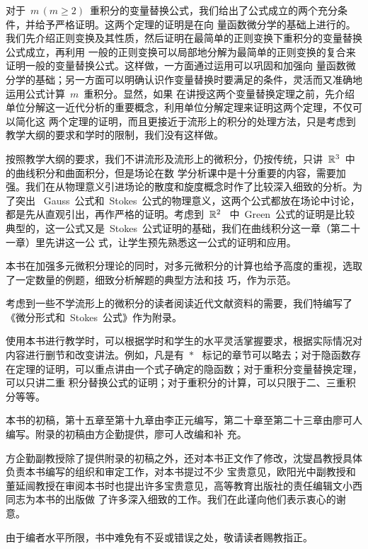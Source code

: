\begin{preface}
对于~$m\,(m\geq 2)$~重积分的变量替换公式，我们给出了公式成立的两个充分条件，并给予严格证明。这两个定理的证明是在向
量函数微分学的基础上进行的。我们先介绍正则变换及其性质，然后证明在最简单的正则变换下重积分的变量替换公式成立，再利用
一般的正则变换可以局部地分解为最简单的正则变换的复合来证明一般的变量替换公式。这样做，一方面通过运用可以巩固和加强向
量函数微分学的基础；另一方面可以明确认识作变量替换时要满足的条件，灵活而又准确地运用公式计算~$m$~重积分。显然，如果
在讲授这两个变量替换定理之前，先介绍单位分解这一近代分析的重要概念，利用单位分解定理来证明这两个定理，不仅可以简化这
两个定理的证明，而且更接近于流形上的积分的处理方法，只是考虑到教学大纲的要求和学时的限制，我们没有这样做。

按照教学大纲的要求，我们不讲流形及流形上的微积分，仍按传统，只讲~$\mathbb{R}^3$~中的曲线积分和曲面积分，但是场论在数
学分析课中是十分重要的内容，需要加强。我们在从物理意义引进场论的散度和旋度概念时作了比较深入细致的分析。为了突出
~Gauss~公式和~Stokes~公式的物理意义，这两个公式都放在场论中讨论，都是先从直观引出，再作严格的证明。考虑到~$\mathbb{R}^2$~
中~Green~公式的证明是比较典型的，这一公式又是~Stokes~公式证明的基础，我们在曲线积分这一章（第二十一章）里先讲这一公
式，让学生预先熟悉这一公式的证明和应用。

本书在加强多元微积分理论的同时，对多元微积分的计算也给予高度的重视，选取了一定数量的例题，细致分析解题的典型方法和技
巧，作为示范。

考虑到一些不学流形上的微积分的读者阅读近代文献资料的需要，我们特编写了《微分形式和~Stokes~公式》作为附录。

使用本书进行教学时，可以根据学时和学生的水平灵活掌握要求，根据实际情况对内容进行删节和改变讲法。例如，凡是有~$\ast$~
标记的章节可以略去；对于隐函数存在定理的证明，可以重点讲由一个式子确定的隐函数；对于重积分变量替换定理，可以只讲二重
积分替换公式的证明；对于重积分的计算，可以只限于二、三重积分等等。

本书的初稿，第十五章至第十九章由李正元编写，第二十章至第二十三章由廖可人编写。附录的初稿由方企勤提供，廖可人改编和补
充。

方企勤副教授除了提供附录的初稿之外，还对本书正文作了修改，沈燮昌教授具体负责本书编写的组织和审定工作，对本书提过不少
宝贵意见，欧阳光中副教授和董延闿教授在审阅本书时也提出许多宝贵意见，高等教育出版社的责任编辑文小西同志为本书的出版做
了许多深入细致的工作。我们在此谨向他们表示衷心的谢意。

由于编者水平所限，书中难免有不妥或错误之处，敬请读者赐教指正。
\end{preface}

\endinput

